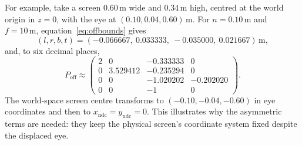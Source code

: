 \documentclass[11pt,a4paper]{article}
\newcommand{\ndc}{\mathrm{ndc}}
\numberwithin{equation}{section}
\begin{document}
For example, take a screen $0.60\,\mathrm m$ wide and $0.34\,\mathrm m$ high, centred at the world origin in $z=0$, with the eye at $(0.10,0.04,0.60)\,\mathrm m$. For $n=0.10\,\mathrm m$ and $f=10\,\mathrm m$, equation~\eqref{eq:offbounds} gives
\begin{equation}
(l,r,b,t)=(-0.066667,\ 0.033333,\ -0.035000,\ 0.021667)\,\mathrm m,
\end{equation}
and, to six decimal places,
\begin{equation}
P_{\mathrm{off}}\approx\begin{pmatrix}
2&0&-0.333333&0\\
0&3.529412&-0.235294&0\\
0&0&-1.020202&-0.202020\\
0&0&-1&0
\end{pmatrix}.
\end{equation}
The world-space screen centre transforms to $(-0.10,-0.04,-0.60)$ in eye coordinates and then to $x_{\ndc}=y_{\ndc}=0$. This illustrates why the asymmetric terms are needed: they keep the physical screen's coordinate system fixed despite the displaced eye.
\end{document}

